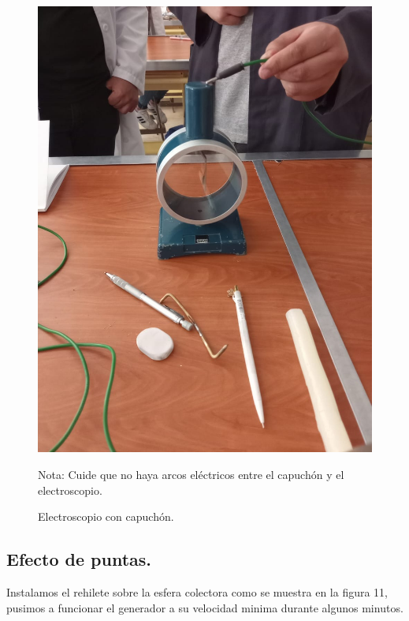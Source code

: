 \documentclass[10pt]{article}
\begin{document}
\begin{multicols}{2}
\begin{figure}[h]
\centering
\includegraphics[scale=0.07]{p13}
\caption{Electroscopio con capuchón.}
Nota: Cuide que no haya arcos eléctricos entre el capuchón y el electroscopio.
\end{figure}
\subsection{Efecto de puntas.}
Instalamos el rehilete sobre la esfera colectora como se muestra en la figura 11, pusimos a funcionar el generador a su velocidad minima durante algunos minutos. 


\end{multicols}
\end{document}
